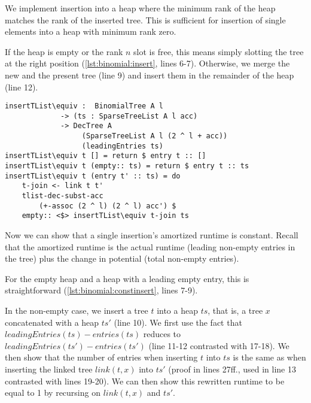We implement insertion into a heap where the minimum rank of the heap matches the rank of the inserted tree. This is sufficient for insertion of single elements into a heap with minimum rank zero.

If the heap is empty or the rank $n$ slot is free, this means simply slotting the tree at the right position (\autoref{lst:binomial:insert}, lines 6-7). Otherwise, we merge the new and the present tree (line 9) and insert them in the remainder of the heap (line 12).

\begin{lstlisting}[caption={Inserting into a heap},label={lst:binomial:insert},emph={BinomialTree,SparseTreeList,insertTList,empty,entry}]
insertTList\equiv :  BinomialTree A l
             -> (ts : SparseTreeList A l acc)
             -> DecTree A
                  (SparseTreeList A l (2 ^ l + acc))
                  (leadingEntries ts)
insertTList\equiv t [] = return $ entry t :: []
insertTList\equiv t (empty:: ts) = return $ entry t :: ts
insertTList\equiv t (entry t' :: ts) = do
    t-join <- link t t'
    tlist-dec-subst-acc
        (+-assoc (2 ^ l) (2 ^ l) acc') $
    empty:: <$> insertTList\equiv t-join ts
\end{lstlisting}

Now we can show that a single insertion's amortized runtime is constant. Recall that the amortized runtime is the actual runtime (leading non-empty entries in the tree) plus the change in potential (total non-empty entries).

For the empty heap and a heap with a leading empty entry, this is straightforward (\autoref{lst:binomial:constinsert}, lines 7-9).

In the non-empty case, we insert a tree $t$ into a heap $ts$, that is, a tree $x$ concatenated with a heap $ts'$ (line 10). We first use the fact that $leadingEntries(ts) - entries(ts)$ reduces to $leadingEntries(ts')-entries(ts')$ (line 11-12 contrasted with 17-18). We then show that the number of entries when inserting $t$ into $ts$ is the same as when inserting the linked tree $link(t, x)$ into $ts'$ (proof in lines 27ff., used in line 13 contrasted with lines 19-20). We can then show this rewritten runtime to be equal to 1 by recursing on $link(t, x)$ and $ts'$.

